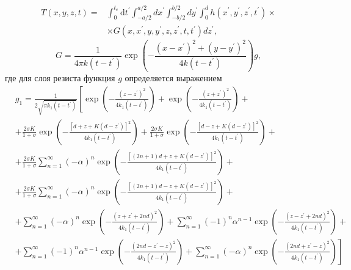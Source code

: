 \begin{equation}
	\begin{split}
		T(x, y, z, t) = & \int_0^{t_e} \mathrm{d} t^{\prime} \int_{-a / 2}^{a / 2} d x^{\prime} \int_{-b / 2}^{b / 2} d y^{\prime} \int_0^d h\left(x^{\prime}, y^{\prime}, z^{\prime}, t^{\prime}\right) \times \\ & \times G\left(x, x^{\prime}, y, y^{\prime}, z, z^{\prime}, t, t^{\prime}\right) d z^{\prime},
	\end{split}
\end{equation}
\begin{equation}
	G=\frac{1}{4 \pi k\left(t-t^{\prime}\right)} \exp \left(-\frac{\left(x-x^{\prime}\right)^2+\left(y-y^{\prime}\right)^2}{4 k\left(t-t^{\prime}\right)}\right) g,
\end{equation}
где для слоя резиста функция $g$ определяется выражением
\begin{equation}
	\begin{aligned}
		&g_1=\frac{1}{2 \sqrt{\pi k_1\left(t-t^{\prime}\right)}}\left[\exp \left(-\frac{\left(z-z^{\prime}\right)^2}{4 k_1\left(t-t^{\prime}\right)}\right)\right.+\exp \left(-\frac{\left(z+z^{\prime}\right)^2}{4 k_1\left(t-t^{\prime}\right)}\right)+\\
		&+\frac{2 \sigma K}{1+\sigma} \exp \left(-\frac{\left[d+z+K\left(d-z^{\prime}\right)\right]^2}{4 k_1\left(t-t^{\prime}\right)}\right)+\frac{2 \sigma K}{1+\sigma} \exp \left(-\frac{\left[d-z+K\left(d-z^{\prime}\right)\right]^2}{4 k_1\left(t-t^{\prime}\right)}\right)+\\
		&+\frac{2 \sigma K}{1+\sigma} \sum_{n=1}^{\infty}(-\alpha)^n \exp \left(-\frac{\left[(2 n+1) d+z+K\left(d-z^{\prime}\right)\right]^2}{4 k_1\left(t-t^{\prime}\right)}\right)+\\
		&+\frac{2 \sigma K}{1+\sigma} \sum_{n=1}^{\infty}(-\alpha)^n \exp \left(-\frac{\left[(2 n+1) d-z+K\left(d-z^{\prime}\right)\right]^2}{4 k_1\left(t-t^{\prime}\right)}\right)+\\
		&+\sum_{n=1}^{\infty}(-\alpha)^n \exp \left(-\frac{\left(z+z^{\prime}+2 n d\right)^2}{4 k_1\left(t-t^{\prime}\right)}\right)+\sum_{n=1}^{\infty}(-1)^n \alpha^{n-1} \exp \left(-\frac{\left(z-z^{\prime}+2 n d\right)^2}{4 k_1\left(t-t^{\prime}\right)}\right)+\\
		&+\sum_{n=1}^{\infty}(-1)^n \alpha^{n-1} \exp \left(-\frac{\left(2 n d-z^{\prime}-z\right)^2}{4 k_1\left(t-t^{\prime}\right)}\right)+\left.\sum_{n=1}^{\infty}(-\alpha)^n \exp \left(-\frac{\left(2 n d+z^{\prime}-z\right)^2}{4 k_1\left(t-t^{\prime}\right)}\right)\right]
	\end{aligned}
\end{equation}
